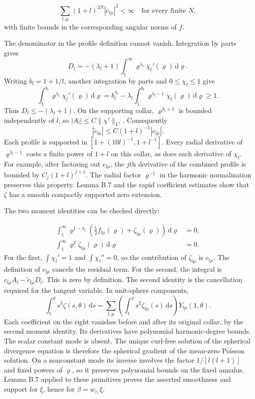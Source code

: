 \documentclass[
  english,
  11pt,
  reqno]{amsart}
\begin{document}
\label{eq:online-extension-scalar-moments-rapid} \[
\sum_{l,\mu}(1+l)^{2N}|c_{l\mu}|^2<\infty
\quad\text{for every finite }N,
\] with finite bounds in the corresponding angular norms of \(f\).

The denominator in the profile definition cannot vanish. Integration by
parts gives \[
D_l=-(\lambda_l+1)
\int_1^\infty\varrho^{\lambda_l}\chi_l'(\varrho)\,\mathrm d\varrho.
\] Writing \(b_l=1+1/l\), another integration by parts and
\(0\le\chi_l\le1\) give \[
\int_1^{b_l}\varrho^{\lambda_l}\chi_l'(\varrho)\,\mathrm d\varrho
=b_l^{\lambda_l}
-\lambda_l\int_1^{b_l}
\varrho^{\lambda_l-1}\chi_l(\varrho)\,\mathrm d\varrho
\ge1.
\] Thus \(D_l\le-(\lambda_l+1)\). On the supporting collar,
\(\varrho^{\lambda_l+1}\) is bounded independently of \(l\), so
\(|A_l|\le C\|\chi'\|_{L^1}\). Consequently \[
|\widetilde c_{l\mu}|
\le C(1+l)^{-1}|c_{l\mu}|.
\] Each profile is supported in \([1+(10l)^{-1},1+l^{-1}]\). Every
radial derivative of \(\varrho^{\lambda_l-1}\) costs a finite power of
\(1+l\) on this collar, as does each derivative of \(\chi_l\). For
example, after factoring out \(c_{l\mu}\), the \(j\)th derivative of the
combined profile is bounded by \(C_j(1+l)^{j+1}\). The radial factor
\(\varrho^{-1}\) in the harmonic normalization preserves this property.
Lemma B.7 and the rapid coefficient estimates show that \(\zeta\) has a
smooth compactly supported zero extension.

The two moment identities can be checked directly:

\label{eq:online-extension-scalar-exact-moments} \[
\begin{aligned}
\int_1^\infty\varrho^{1-\lambda_l}
\left(\frac12 f_{l\mu}(\varrho)+\zeta_{l\mu}(\varrho)\right)
\,\mathrm d\varrho&=0,\\
\int_1^\infty\varrho^2\zeta_{l\mu}(\varrho)\,\mathrm d\varrho&=0.
\end{aligned}
\] For the first, \(\int\chi_l'=1\) and \(\int\chi_l''=0\), so the
contribution of \(\zeta_{l\mu}\) is \(c_{l\mu}\). The definition of
\(c_{l\mu}\) cancels the residual term. For the second, the integral is
\(c_{l\mu}A_l-\widetilde c_{l\mu}D_l\). This is zero by definition. The
second identity is the cancellation required for the tangent variable.
In unit-sphere components, \[
\int_1^\varrho s^3\zeta(s,\theta)\,\mathrm ds
=\sum_{l,\mu}
\left(\int_1^\varrho s^2\zeta_{l\mu}(s)\,\mathrm ds\right)
Y_{l\mu}(1,\theta).
\] Each coefficient on the right vanishes before and after its original
collar, by the second moment identity. Its derivatives have polynomial
harmonic-degree bounds. The scalar constant mode is absent. The unique
curl-free solution of the spherical divergence equation is therefore the
spherical gradient of the mean-zero Poisson solution. On a nonconstant
mode its inverse involves the factor \(1/[l(l+1)]\) and fixed powers of
\(\varrho\), so it preserves polynomial bounds on the fixed annulus.
Lemma B.7 applied to these primitives proves the asserted smoothness and
support for \(\xi\), hence for \(\beta=w_{\varepsilon_\gamma}\xi\).
\end{document}
